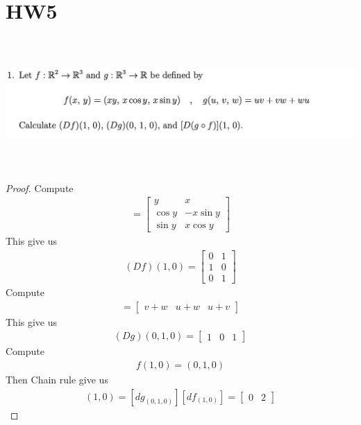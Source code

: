 \documentclass{report}
\begin{document}
\section{HW5}
\begin{question}{}{}
\includegraphics[height=5cm,width=18cm]{ahw5q1}
\end{question}
\begin{proof}
Compute 
\begin{align*}
[df_{(x,y)}]=\begin{bmatrix}
  y & x \\
  \cos y & -x \sin y \\
  \sin y & x\cos y 
\end{bmatrix}
\end{align*}
This give us 
\begin{align*}
  (Df)(1,0)=\begin{bmatrix}
    0 & 1 \\
    1 & 0\\
    0 & 1
  \end{bmatrix}
\end{align*}
Compute 
\begin{align*}
[dg_{(0,1,0)}]=\begin{bmatrix}
  v+w & u+w & u+v
\end{bmatrix}
\end{align*}
This give us 
\begin{align*}
  (Dg)(0,1,0)=\begin{bmatrix}
    1 & 0 & 1
  \end{bmatrix}
\end{align*}
Compute 
\begin{align*}
f(1,0)=(0,1,0)
\end{align*}
Then Chain rule give us 
\begin{align*}
[D(g\circ f)](1,0)=[dg_{(0,1,0)}][df_{(1,0)}]= \begin{bmatrix}
  0 & 2
\end{bmatrix}
\end{align*}
\end{proof}
\end{document}
